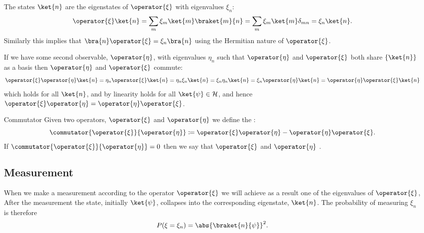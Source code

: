 \documentclass[fleqn]{NotesClass}
\newcommand*{\hilbert}{\mathcal{H}}
\begin{document}
    The states \(\ket{n}\) are the eigenstates of \(\operator{\xi}\) with eigenvalues \(\xi_n\):
    \begin{equation}
        \operator{\xi} \ket{n} = \sum_m \xi_m \ket{m}\braket{m}{n} = \sum_m \xi_m \ket{m}\delta_{mn} = \xi_n\ket{n}.
    \end{equation}
    Similarly this implies that \(\bra{n}\operator{\xi} = \xi_n\bra{n}\) using the Hermitian nature of \(\operator{\xi}\).
    
    If we have some second observable, \(\operator{\eta}\), with eigenvalues \(\eta_n\) such that \(\operator{\eta}\) and \(\operator{\xi}\) both share \(\{\ket{n}\}\) as a basis then \(\operator{\eta}\) and \(\operator{\xi}\) commute:
    \begin{equation}
        \operator{\xi}\operator{\eta} \ket{n} = \eta_n\operator{\xi}\ket{n} = \eta_n\xi_n\ket{n} = \xi_n\eta_n\ket{n} = \xi_n\operator{\eta}\ket{n} = \operator{\eta}\operator{\xi}\ket{n}
    \end{equation}
    which holds for all \(\ket{n}\), and by linearity holds for all \(\ket{\psi}\in\hilbert\), and hence \(\operator{\xi}\operator{\eta} = \operator{\eta}\operator{\xi}\).
    \begin{dfn}{Commutator}{}
        Given two operators, \(\operator{\xi}\) and \(\operator{\eta}\) we define the :
        \begin{equation}
            \commutator{\operator{\xi}}{\operator{\eta}} \coloneqq \operator{\xi}\operator{\eta} - \operator{\eta}\operator{\xi}.
        \end{equation}
        If \(\commutator{\operator{\xi}}{\operator{\eta}} = 0\) then we say that \(\operator{\xi}\) and \(\operator{\eta}\) .
    \end{dfn}
    
    \subsection{Measurement}
    When we make a measurement according to the operator \(\operator{\xi}\) we will achieve as a result one of the eigenvalues of \(\operator{\xi}\),
    After the measurement the state, initially \(\ket{\psi}\), collapses into the corresponding eigenstate, \(\ket{n}\).
    The probability of measuring \(\xi_n\) is therefore
    \begin{equation}
        P(\xi = \xi_n) = \abs{\braket{n}{\psi}}^2.
    \end{equation}
    
\end{document}

